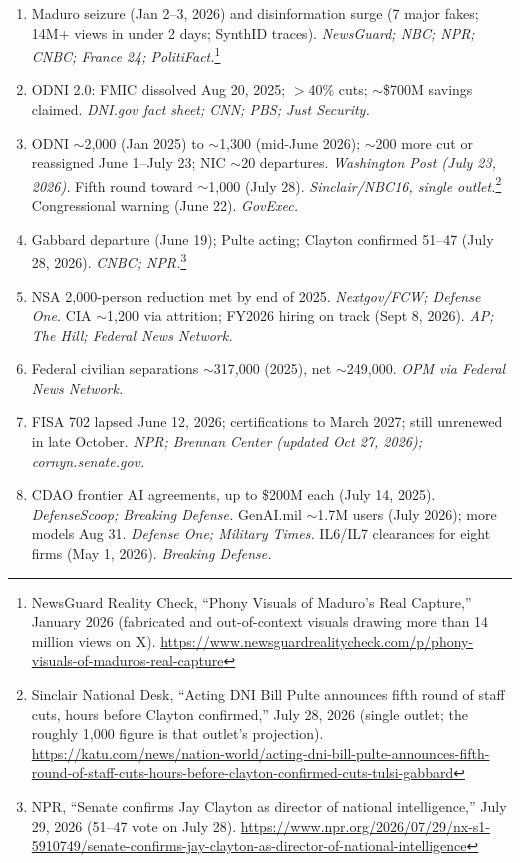 \documentclass[11pt,letterpaper]{article}
\begin{document}
{\small
\begin{enumerate}[itemsep=1pt]
  \item Maduro seizure (Jan 2--3, 2026) and disinformation surge (7 major fakes; 14M+ views in under 2 days; SynthID traces). \textit{NewsGuard; NBC; NPR; CNBC; France 24; PolitiFact.}\footnote{NewsGuard Reality Check, ``Phony Visuals of Maduro's Real Capture,'' January 2026 (fabricated and out-of-context visuals drawing more than 14 million views on X). \url{https://www.newsguardrealitycheck.com/p/phony-visuals-of-maduros-real-capture}}
  \item ODNI 2.0: FMIC dissolved Aug 20, 2025; $>$40\% cuts; $\sim$\$700M savings claimed. \textit{DNI.gov fact sheet; CNN; PBS; Just Security.}
  \item ODNI $\sim$2,000 (Jan 2025) to $\sim$1,300 (mid-June 2026); $\sim$200 more cut or reassigned June 1--July 23; NIC $\sim$20 departures. \textit{Washington Post (July 23, 2026).} Fifth round toward $\sim$1,000 (July 28). \textit{Sinclair/NBC16, single outlet.}\footnote{Sinclair National Desk, ``Acting DNI Bill Pulte announces fifth round of staff cuts, hours before Clayton confirmed,'' July 28, 2026 (single outlet; the roughly 1,000 figure is that outlet's projection). {\def\UrlBreaks{\do\/\do-}\url{https://katu.com/news/nation-world/acting-dni-bill-pulte-announces-fifth-round-of-staff-cuts-hours-before-clayton-confirmed-cuts-tulsi-gabbard}}} Congressional warning (June 22). \textit{GovExec.}
  \item Gabbard departure (June 19); Pulte acting; Clayton confirmed 51--47 (July 28, 2026). \textit{CNBC; NPR.}\footnote{NPR, ``Senate confirms Jay Clayton as director of national intelligence,'' July 29, 2026 (51--47 vote on July 28). \url{https://www.npr.org/2026/07/29/nx-s1-5910749/senate-confirms-jay-clayton-as-director-of-national-intelligence}}
  \item NSA 2,000-person reduction met by end of 2025. \textit{Nextgov/FCW; Defense One.} CIA $\sim$1,200 via attrition; FY2026 hiring on track (Sept 8, 2026). \textit{AP; The Hill; Federal News Network.}
  \item Federal civilian separations $\sim$317,000 (2025), net $\sim$249,000. \textit{OPM via Federal News Network.}
  \item FISA 702 lapsed June 12, 2026; certifications to March 2027; still unrenewed in late October. \textit{NPR; Brennan Center (updated Oct 27, 2026); cornyn.senate.gov.}
  \item CDAO frontier AI agreements, up to \$200M each (July 14, 2025). \textit{DefenseScoop; Breaking Defense.} GenAI.mil $\sim$1.7M users (July 2026); more models Aug 31. \textit{Defense One; Military Times.} IL6/IL7 clearances for eight firms (May 1, 2026). \textit{Breaking Defense.}

\end{enumerate}}
\end{document}
